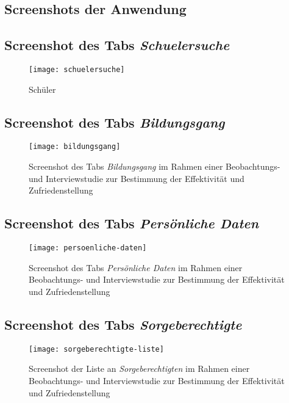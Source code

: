 \begin{landscape}
\section{Screenshots der Anwendung}
    \subsection{Screenshot des Tabs \textit{Schuelersuche}}
    \label{section-schuelersuche}
    \begin{figure}[H]
        \centering
        \caption{Schüler}
        \begin{adjustbox}{width=\linewidth, center}
            \texttt{[image: schuelersuche]}
        \end{adjustbox}
    \end{figure}

    \subsection{Screenshot des Tabs \textit{Bildungsgang}}
    \label{section-bildungsgang}
    \begin{figure}[H]
        \centering
        \caption{Screenshot des Tabs \textit{Bildungsgang} im Rahmen einer Beobachtungs- und Interviewstudie zur Bestimmung der Effektivität und Zufriedenstellung}
        \begin{adjustbox}{width=\linewidth, center}
            \texttt{[image: bildungsgang]}
        \end{adjustbox}
    \end{figure}

    \subsection{Screenshot des Tabs \textit{Persönliche Daten}}
    \label{section-persoenliche-daten}
    \begin{figure}[H]
        \centering
        \caption{Screenshot des Tabs \textit{Persönliche Daten} im Rahmen einer Beobachtungs- und Interviewstudie zur Bestimmung der Effektivität und Zufriedenstellung}
        \begin{adjustbox}{width=\linewidth, center}
            \texttt{[image: persoenliche-daten]}
        \end{adjustbox}
    \end{figure}

    \subsection{Screenshot des Tabs \textit{Sorgeberechtigte}}
    \label{section-sorgeberechtigte-liste}
    \begin{figure}[H]
        \centering
        \caption{Screenshot der Liste an \textit{Sorgeberechtigten} im Rahmen einer Beobachtungs- und Interviewstudie zur Bestimmung der Effektivität und Zufriedenstellung}
        \begin{adjustbox}{width=\linewidth, center}
            \texttt{[image: sorgeberechtigte-liste]}
        \end{adjustbox}
    \end{figure}


\end{landscape}
